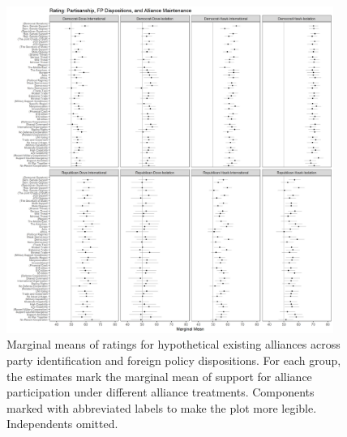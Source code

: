 \documentclass[12pt]{article}
\begin{document}
\begin{figure}
	\centering
		\includegraphics[width=0.95\textwidth]{party-dispo-mainapp.png}
	\caption{Marginal means of ratings for hypothetical existing alliances across party identification and foreign policy dispositions. For each group, the estimates mark the marginal mean of support for alliance participation under different alliance treatments. Components marked with abbreviated labels to make the plot more legible. Independents omitted.}
	\label{fig:party-dispo-main}
\end{figure}


\newpage

 
 
\end{document}
